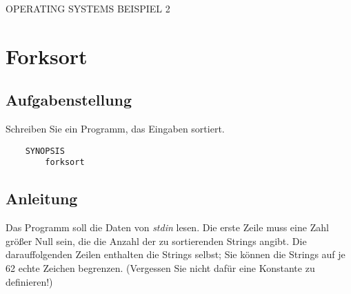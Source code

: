 \documentclass{article}
\begin{document}
\begin{center}
\begin{Large}
OPERATING SYSTEMS BEISPIEL 2
\end{Large}
\end{center}

\section{Forksort}

\subsection{Aufgabenstellung}
Schreiben Sie ein Programm, das Eingaben sortiert.
\begin{verbatim}
    SYNOPSIS
        forksort
\end{verbatim}

\subsection{Anleitung}
Das Programm soll die Daten von \emph{stdin} lesen. Die erste Zeile muss eine
Zahl größer Null sein, die die Anzahl der zu sortierenden Strings angibt.
Die darauffolgenden Zeilen enthalten die Strings selbst; Sie können die
Strings auf je 62 echte Zeichen begrenzen. (Vergessen Sie nicht dafür eine
Konstante zu definieren!)
\end{document}
